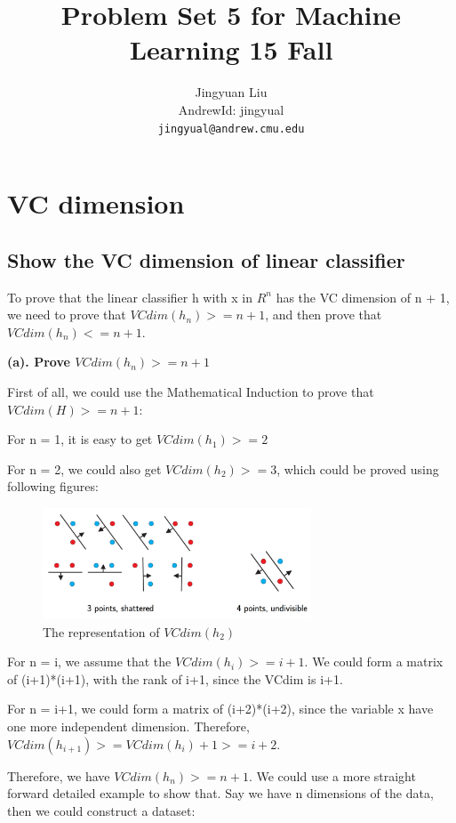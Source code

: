 \documentclass{article} %
\title{Problem Set 5 for Machine Learning 15 Fall}
\author{
Jingyuan Liu\\
AndrewId: jingyual\\
\texttt{jingyual@andrew.cmu.edu} \\
}
\begin{document}
\maketitle



\section{VC dimension}


\subsection{Show the VC dimension of linear classifier}
To prove that the linear classifier h with x in $ R^n $ has the VC dimension of
n + 1, we need to prove that $VCdim(h_n) >= n + 1$, and then prove that
$VCdim(h_n) <= n + 1$.

\textbf{(a). Prove $VCdim(h_n) >= n+1$}

First of all, we could use the Mathematical Induction to prove that $VCdim(H) >=
n+1$:

For n = 1, it is easy to get $VCdim(h_1) >= 2$

For n = 2, we could also get $VCdim(h_2) >= 3$, which could be proved using following figures:

\begin{figure}[!htbp]
\begin{center}
\includegraphics[width=80mm]{pic/q11.png}
\end{center}
\caption{The representation of $VCdim(h_2)$}
\end{figure}

For n = i, we assume that the $VCdim(h_i) >= i+1$. We could form a matrix of
(i+1)*(i+1),
with the rank of i+1, since the VCdim is i+1.

For n = i+1, we could form a matrix of (i+2)*(i+2), since the variable
x have one more independent dimension. Therefore, $VCdim(h_{i+1}) >= VCdim(h_i) + 1
>= i+2$.

Therefore, we have $VCdim(h_n) >= n+1$. We could use a more straight forward
detailed example to show that. Say we have n dimensions of the data, then we
could construct a dataset:
\end{document}
